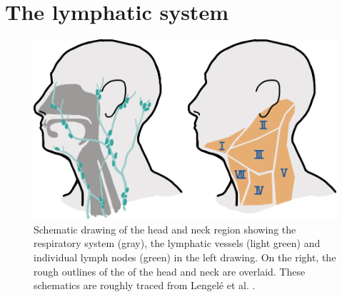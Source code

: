 \documentclass[\relativeRoot/main.tex]{subfiles}
\begin{document}
\section{The lymphatic system}
\label{sec:intro:lymph_system}

\begin{figure}
    \centering
    \includegraphics[width=\textwidth]{figures/schematics_head.pdf}
    \caption[
        Schematics of the head and neck regions with the anatomically defined LNLs
    ]{
        Schematic drawing of the head and neck region showing the respiratory system (gray), the lymphatic vessels (light green) and individual lymph nodes (green) in the left drawing. On the right, the rough outlines of the  of the head and neck are overlaid. These schematics are roughly traced from Lengelé et al. \cite{lengele_anatomical_2007}.
    }
    \label{fig:intro:schematics_head}
\end{figure}
\end{document}
